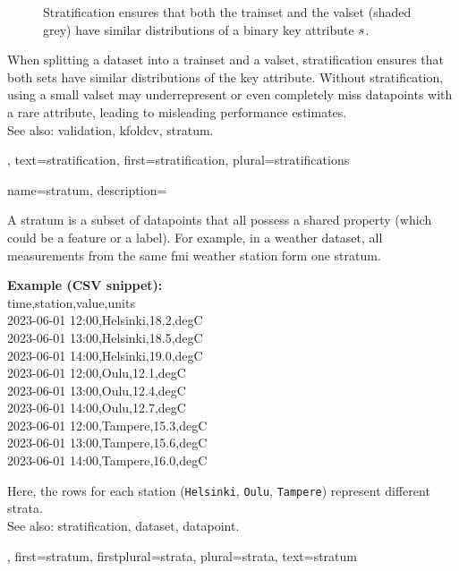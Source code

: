{{\begin{figure}[H]
 	\caption{Stratification ensures that both the \gls{trainset} and the \gls{valset} 
	(shaded grey) have similar 
 		distributions of a binary key attribute $s$.}
 \end{figure}
  When splitting a \gls{dataset} into a \gls{trainset} and a \gls{valset}, 
  stratification ensures that both sets have similar distributions of the key attribute. 
  Without stratification, using a small \gls{valset} may underrepresent or 
  even completely miss \glspl{datapoint} with a rare attribute, leading to misleading 
  performance estimates.\\ 
  See also: \gls{validation}, \gls{kfoldcv}, \gls{stratum}.},
  text={stratification},
  first={stratification},
  plural={stratifications}%
}

{name={stratum},
	description={
	A stratum is a subset of \glspl{datapoint} that all 
	possess a shared property (which could be a \gls{feature} or a \gls{label}). 
	For example, in a weather \gls{dataset}, all measurements from the same 
	\gls{fmi} weather station form one stratum.\\[0.5em]
	\begin{center}
\textbf{Example (CSV snippet):}\\
  {\ttfamily
  time,station,value,units\\
  2023-06-01 12:00,Helsinki,18.2,degC\\
  2023-06-01 13:00,Helsinki,18.5,degC\\
  2023-06-01 14:00,Helsinki,19.0,degC\\
  2023-06-01 12:00,Oulu,12.1,degC\\
  2023-06-01 13:00,Oulu,12.4,degC\\
  2023-06-01 14:00,Oulu,12.7,degC\\
  2023-06-01 12:00,Tampere,15.3,degC\\
  2023-06-01 13:00,Tampere,15.6,degC\\
  2023-06-01 14:00,Tampere,16.0,degC
  }
	\end{center} 
	Here, the rows for each station (\texttt{Helsinki}, \texttt{Oulu}, \texttt{Tampere}) 
	represent different strata.\\ 
	See also: \gls{stratification}, \gls{dataset}, \gls{datapoint}.},
  first={stratum},
  firstplural={strata},
 plural={strata}, 
 text={stratum}
}


